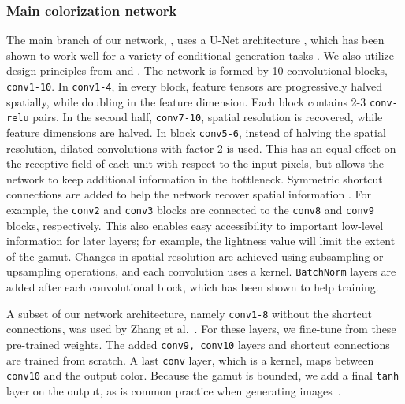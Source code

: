\documentclass[acmtog,authorversion]{acmart}
\begin{document}
\subsubsection{Main colorization network} The main branch of our network, , uses a U-Net architecture \cite{ronneberger2015u}, which has been shown to work well for a variety of conditional generation tasks \cite{isola2016image}. We also utilize design principles from \cite{simonyan2014very} and \cite{yu2015multi}. The network is formed by 10 convolutional blocks, \texttt{conv1-10}. In \texttt{conv1-4}, in every block, feature tensors are progressively halved spatially, while doubling in the feature dimension. Each block contains 2-3 \texttt{conv-relu} pairs. In the second half, \texttt{conv7-10}, spatial resolution is recovered, while feature dimensions are halved. In block \texttt{conv5-6}, instead of halving the spatial resolution, dilated convolutions with factor 2 is used. This has an equal effect on the receptive field of each unit with respect to the input pixels, but allows the network to keep additional information in the bottleneck. Symmetric shortcut connections are added to help the network recover spatial information \cite{ronneberger2015u}. For example, the \texttt{conv2} and \texttt{conv3} blocks are connected to the \texttt{conv8} and \texttt{conv9} blocks, respectively. This also enables easy accessibility to important low-level information for later layers; for example, the lightness value will limit the extent of the  gamut. Changes in spatial resolution are achieved using subsampling or upsampling operations, and each convolution uses a  kernel. \texttt{BatchNorm} layers are added after each convolutional block, which has been shown to help training.

A subset of our network architecture, namely \texttt{conv1-8} without the shortcut connections, was used by Zhang et al.~. For these layers, we fine-tune from these pre-trained weights. The added \texttt{conv9, conv10} layers and shortcut connections are trained from scratch. A last \texttt{conv} layer, which is a  kernel, maps between \texttt{conv10} and the output color. Because the  gamut is bounded, we add a final \texttt{tanh} layer on the output, as is common practice when generating images~\cite{goodfellow2014generative,zhu2016generative}.
\end{document}
